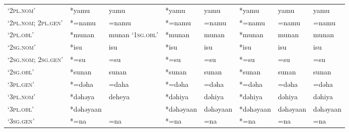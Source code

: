 \begin{landscape}
\begin{longtable}[c]{@{}p{3cm}<{\raggedright}p{2.75cm}<{\raggedright}p{2.75cm}<{\raggedright}p{2.75cm}<{\raggedright}p{2.75cm}<{\raggedright}p{2.75cm}<{\raggedright}p{2.75cm}<{\raggedright}p{2.75cm}<{\raggedright}@{}}
`\textsc{2pl.nom}'                                   & *yamu              & yamu                           & *yamu              & yamu                       & *yamu            & yamu                     & yamu                              \\
`\textsc{2pl.nom; 2pl.gen}'                          & *=namu             & =namu                          & *=namu             & =namu                      & *=namu           & =namu                    & =namu                             \\
`\textsc{2pl.obl}'                                   & *munan             & munan `\textsc{1sg.obl}'                & *munan             & munan                      & *munan           & munan                    & munan                             \\
`\textsc{2sg.nom}'                                   & *isu               & isu                            & *isu               & isu                        & *isu             & isu                      & isu                               \\
`\textsc{2sg.nom; 2sg.gen}'                          & *=su               & =su                            & *=su               & =su                        & *=su             & =su                      & =su                               \\
`\textsc{2sg.obl}'                                   & *sunan             & sunan                          & *sunan             & sunan                      & *sunan           & sunan                    & sunan                             \\
`\textsc{3pl.gen}'                                   & *=dəha             & =daha                          & *=dəha             & =dəha                      & *=dəha           & =dəha                    & =dəha                             \\
`\textsc{3pl.nom}'                                   & *dəhəya            & deheya                         & *dəhiya            & dəhiya                     & *dəhiya          & dəhiya                   & dəhiya                            \\
`\textsc{3pl.obl}'                                   & *dəhəyaan          &                                & *dəhəyaan          & dəhəyaan                   & *dəhəyaan        & dəhəyaan                 & dəhəyaan                          \\
`\textsc{3sg.gen}'                                   & *=na               & =na                            & *=na               & =na                        & *=na             & =na                      & =na                               \\

\end{longtable}
\end{landscape}
